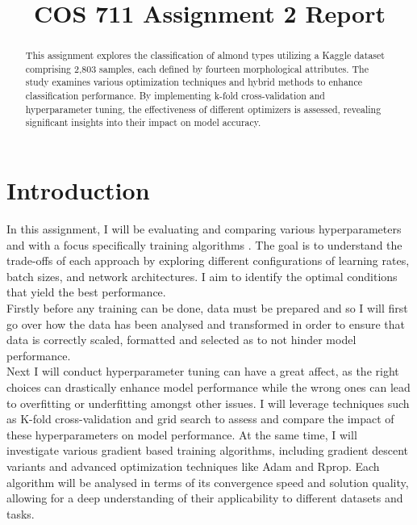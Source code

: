 \documentclass[conference]{IEEEtran}
\begin{document}
\title{COS 711 Assignment 2 Report\\
}

\author{
}

\maketitle

\begin{abstract}
This assignment explores the classification of almond types utilizing a Kaggle dataset comprising 2,803 samples, each defined by fourteen morphological attributes. The study examines various optimization techniques and hybrid methods to enhance classification performance. By implementing k-fold cross-validation and hyperparameter tuning, the effectiveness of different optimizers is assessed, revealing significant insights into their impact on model accuracy.
\end{abstract}

\section{Introduction}
In this assignment, I will be evaluating and comparing various hyperparameters and with a focus specifically training algorithms . The goal is to understand the trade-offs of each approach by exploring different configurations of learning rates, batch sizes, and network architectures. I aim to identify the optimal conditions that yield the best performance.\\

Firstly before any training can be done, data must be prepared and so I will first go over how the data has been analysed and transformed in order to ensure that data is correctly scaled, formatted and selected as to not hinder model performance.\\

Next I will conduct hyperparameter tuning can have a great affect, as the right choices can drastically enhance model performance while the wrong ones can lead to overfitting or underfitting amongst other issues. I will leverage techniques such as K-fold cross-validation and grid search to assess and compare the impact of these hyperparameters on model performance. At the same time, I will investigate various gradient based training algorithms, including gradient descent variants and advanced optimization techniques like Adam and Rprop. Each algorithm will be analysed in terms of its convergence speed and solution quality, allowing for a deep understanding of their applicability to different datasets and tasks.\\
\end{document}
